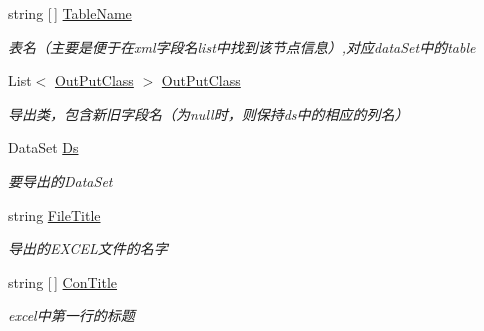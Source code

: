\begin{DoxyCompactItemize}
\item 
string \mbox{[}$\,$\mbox{]} \hyperlink{class_x_c_l_net_tools_1_1_entity_1_1_office_1_1_excel_handler_1_1_out_put_param_class_a0a911a788ec6d71dd31abd3624400b67}{Table\+Name}
\begin{DoxyCompactList}\small\item\em 表名（主要是便于在xml字段名list中找到该节点信息）,对应data\+Set中的table \end{DoxyCompactList}\item 
List$<$ \hyperlink{class_x_c_l_net_tools_1_1_entity_1_1_office_1_1_excel_handler_1_1_out_put_class}{Out\+Put\+Class} $>$ \hyperlink{class_x_c_l_net_tools_1_1_entity_1_1_office_1_1_excel_handler_1_1_out_put_param_class_adc8f68c8e223e5653d29efabacc56b65}{Out\+Put\+Class}
\begin{DoxyCompactList}\small\item\em 导出类，包含新旧字段名（为null时，则保持ds中的相应的列名） \end{DoxyCompactList}\item 
Data\+Set \hyperlink{class_x_c_l_net_tools_1_1_entity_1_1_office_1_1_excel_handler_1_1_out_put_param_class_a3f2d60db6c0602122169dd392caed6c0}{Ds}
\begin{DoxyCompactList}\small\item\em 要导出的\+Data\+Set \end{DoxyCompactList}\item 
string \hyperlink{class_x_c_l_net_tools_1_1_entity_1_1_office_1_1_excel_handler_1_1_out_put_param_class_a9825b6c0aa98a7e758376b5de8af1991}{File\+Title}
\begin{DoxyCompactList}\small\item\em 导出的\+E\+X\+C\+E\+L文件的名字 \end{DoxyCompactList}\item 
string \mbox{[}$\,$\mbox{]} \hyperlink{class_x_c_l_net_tools_1_1_entity_1_1_office_1_1_excel_handler_1_1_out_put_param_class_a0acbd053010430b65a37f7c0b28e122e}{Con\+Title}
\begin{DoxyCompactList}\small\item\em excel中第一行的标题 \end{DoxyCompactList}\item 

\end{DoxyCompactItemize}
